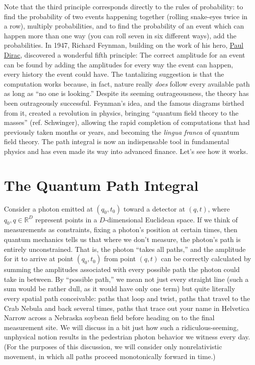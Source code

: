 \documentclass{amsart}
\newcommand{\reals}{\mathbb{R}}
\newcommand{\qv}{q}
\begin{document}
Note that the third principle corresponds directly to the rules of probability: to find the probability of two events happening together (rolling snake-eyes twice in a row), multiply probabilities, and to find the probability of an event which can happen more than one way (you can roll seven in six different ways), add the probabilities.  In 1947, Richard Feynman, building on the work of his hero, \href{http://www-groups.dcs.st-andrews.ac.uk/~history/Mathematicians/Dirac.html}{Paul Dirac}, discovered a wonderful fifth principle: The correct amplitude for an event can be found by adding the amplitudes for every way the event can happen, every history the event could have.  The tantalizing suggestion is that the computation works because, in fact, nature really \emph{does} follow every available path as long as ``no one is looking.''  Despite its seeming outrageousness, the theory has been outrageously successful.  Feynman's idea, and the famous diagrams birthed from it, created a revolution in physics, bringing ``quantum field theory to the masses'' (ref. Schwinger), allowing the rapid completion of computations that had previously taken months or years, and becoming the \emph{lingua franca} of quantum field theory.  The path integral is now an indispensable tool in fundamental physics and has even made its way into advanced finance.  Let's see how it works.

\section{The Quantum Path Integral}

Consider a photon emitted at $(\qv_0,t_0)$ toward a detector at $(\qv,t)$, where $\qv_0,\qv \in \reals^D$ represent points in a $D$-dimensional Euclidean space.  If we think of measurements as constraints, fixing a photon's position at certain times, then quantum mechanics tells us that where we don't measure, the photon's path is entirely unconstrained.  That is, the photon ``takes all paths,'' and the amplitude for it to arrive at point $(\qv_0,t_0)$ from point $(\qv,t)$ can be correctly calculated by summing the amplitudes associated with every possible path the photon could take in between.  By ``possible path,'' we mean not just every straight line (such a sum would be rather dull, as it would have only one term) but quite literally every spatial path conceivable: paths that loop and twist, paths that travel to the Crab Nebula and back several times, paths that trace out your name in Helvetica Narrow across a Nebraska soybean field before heading on to the final measurement site.  We will discuss in a bit just how such a ridiculous-seeming, unphysical notion results in the pedestrian photon behavior we witness every day.  (For the purposes of this discussion, we will consider only nonrelativistic movement, in which all paths proceed monotonically forward in time.)
\end{document}
